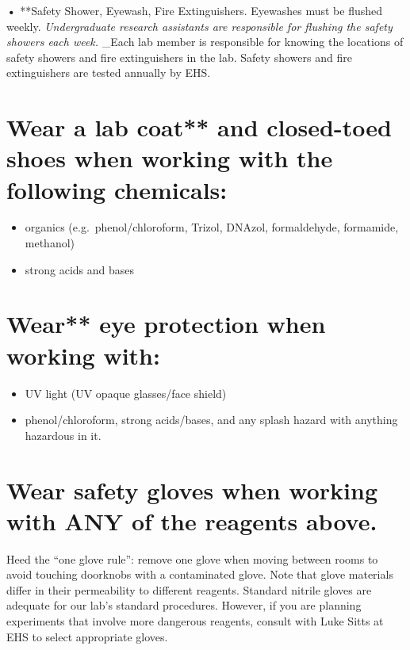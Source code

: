 \documentclass[
]{book}
\begin{document}
\textbf{•} **Safety Shower, Eyewash, Fire Extinguishers. Eyewashes must be flushed weekly. \emph{Undergraduate research assistants are responsible for flushing the safety showers each week.} \_Each lab member is responsible for knowing the locations of safety showers and fire extinguishers in the lab. Safety showers and fire extinguishers are tested annually by EHS.

\hypertarget{wear-a-lab-coat-and-closed-toed-shoes-when-working-with-the-following-chemicals}{%
\section{\texorpdfstring{Wear a lab coat** \textbf{and closed-toed shoes} \textbf{when working with the following chemicals:}}{Wear a lab coat** and closed-toed shoes when working with the following chemicals:}}\label{wear-a-lab-coat-and-closed-toed-shoes-when-working-with-the-following-chemicals}}

\begin{itemize}
\item
  organics (e.g.~phenol/chloroform, Trizol, DNAzol, formaldehyde, formamide, methanol)
\item
  strong acids and bases
\end{itemize}

\hypertarget{wear-eye-protection-when-working-with}{%
\section{\texorpdfstring{Wear** \textbf{eye protection} \textbf{when working with:}}{Wear** eye protection when working with:}}\label{wear-eye-protection-when-working-with}}

\begin{itemize}
\item
  UV light (UV opaque glasses/face shield)
\item
  phenol/chloroform, strong acids/bases, and any splash hazard with anything hazardous in it.
\end{itemize}

\hypertarget{wear-safety-gloves-when-working-with-any-of-the-reagents-above.}{%
\section{Wear safety gloves when working with ANY of the reagents above.}\label{wear-safety-gloves-when-working-with-any-of-the-reagents-above.}}

Heed the ``one glove rule'': remove one glove when moving between rooms to avoid touching doorknobs with a contaminated glove. Note that glove materials differ in their permeability to different reagents. Standard nitrile gloves are adequate for our lab's standard procedures. However, if you are planning experiments that involve more dangerous reagents, consult with Luke Sitts at EHS to select appropriate gloves.
\end{document}
